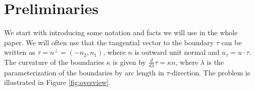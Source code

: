 \documentclass{article}
\theoremstyle{definition}
\theoremstyle{definition}
\newcommand{\Pra}{\rm{Pr}}
\newcommand{\Ra}{{\rm{Ra}}}
\newcommand{\Nu}{{\rm{Nu}}}
\begin{document}





\section{Preliminaries}
We start with introducing some notation and facts we will use in the whole paper. 
We will often use that the tangential vector to the boundary $\tau$ can be written as $\tau = n^\perp=(-n_2,n_1)$, where $n$ is outward unit normal and $u_\tau = u\cdot \tau$. 
 The curvature of the boundaries $\kappa$ is given by $\frac{d}{d\lambda} \tau = \kappa n$, where $\lambda$ is the parameterization of the boundaries by arc length in $\tau$-direction. The problem is illustrated in Figure \ref{fig:overview}.
\end{document}

